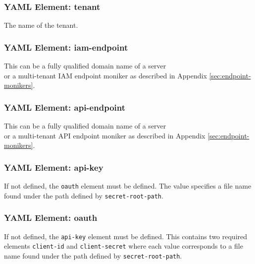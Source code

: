 \subsubsection{YAML Element: tenant}\label{sec:yaml-cxone-tenant}
The name of the \cxone tenant.

\subsubsection{YAML Element: iam-endpoint}\label{sec:yaml-cxone-iam-endpoint}
This can be a fully qualified domain name of a server\\or a multi-tenant IAM endpoint moniker as described in Appendix \ref{sec:endpoint-monikers}.

\subsubsection{YAML Element: api-endpoint}\label{sec:yaml-cxone-api-endpoint}
This can be a fully qualified domain name of a server\\or a multi-tenant API endpoint moniker as described in Appendix \ref{sec:endpoint-monikers}.

\subsubsection{YAML Element: api-key}\label{sec:yaml-cxone-api-key}
If not defined, the \texttt{oauth} element must be defined. The value specifies a file name found under the path defined by \texttt{secret-root-path}.

\subsubsection{YAML Element: oauth}\label{sec:yaml-cxone-oauth}
If not defined, the \texttt{api-key} element must be defined. This contains two required elements
\texttt{client-id} and \texttt{client-secret} where each value corresponds to a file name found under the path defined by \texttt{secret-root-path}. 


